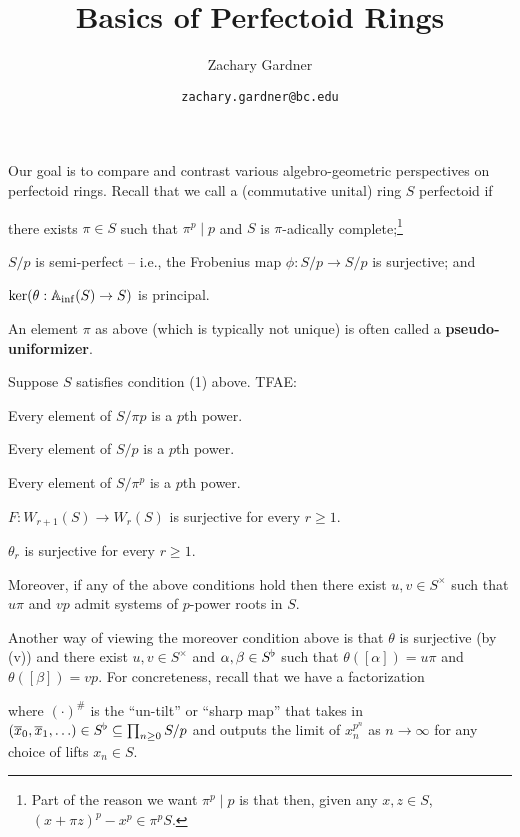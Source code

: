 \documentclass[11pt]{article}
\begin{document}
\title{Basics of Perfectoid Rings}
\author{Zachary Gardner}
\date{\texttt{zachary.gardner@bc.edu}}
\maketitle

Our goal is to compare and contrast various algebro-geometric perspectives on perfectoid rings. Recall that we call a (commutative unital) ring $S$ perfectoid if 
\begin{enum}{\arabic}
\item there exists $\pi\in S$ such that $\pi^p\mid p$ and $S$ is $\pi$-adically complete;\footnote{Part of the reason we want $\pi^p\mid p$ is that then, given any $x,z\in S$, $(x+\pi z)^p-x^p\in\pi^p S$.}
\item $S/p$ is semi-perfect -- i.e., the Frobenius map $\phi: S/p\to S/p$ is surjective; and 
\item $\ker(\theta: \mathbb{A}_{\inf}(S)\to S)$ is principal.
\end{enum}

An element $\pi$ as above (which is typically not unique) is often called a \textbf{pseudo-uniformizer}.

\begin{lemma}\label{p_power_equiv}
Suppose $S$ satisfies condition \textup{(1)} above. TFAE:
\begin{enum}{\roman}
\item Every element of $S/\pi p$ is a $p$th power.
\item Every element of $S/p$ is a $p$th power.
\item Every element of $S/\pi^p$ is a $p$th power.
\item $F: W_{r+1}(S)\to W_r(S)$ is surjective for every $r\geq1$.
\item $\theta_r$ is surjective for every $r\geq1$.
\end{enum}
Moreover, if any of the above conditions hold then there exist $u,v\in S^{\times}$ such that $u\pi$ and $vp$ admit systems of $p$-power roots in $S$.
\end{lemma}

Another way of viewing the moreover condition above is that $\theta$ is surjective (by \textup{(v)}) and there exist $u,v\in S^{\times}$ and $\alpha,\beta\in S^{\flat}$ such that $\theta([\alpha])=u\pi$ and $\theta([\beta])=vp$. For concreteness, recall that we have a factorization
\begin{center}
\end{center}
where $(\cdot)^{\#}$ is the ``un-tilt'' or ``sharp map'' that takes in $(\overline{x}_0,\overline{x}_1,\ldots)\in S^{\flat}\subseteq\prod_{n\geq0}S/p$ and outputs the limit of $x_n^{p^n}$ as $n\to\infty$ for any choice of lifts $x_n\in S$.
\end{document}
